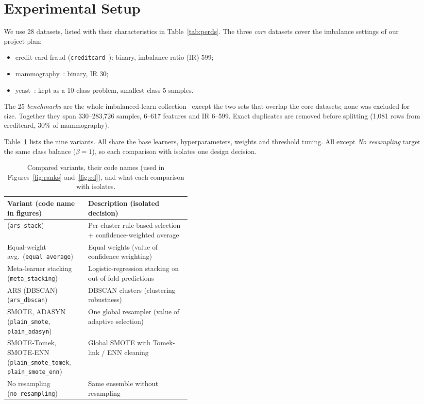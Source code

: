 \section{Experimental Setup}\label{sec:setup}

We use 28 datasets, listed with their characteristics in Table~\ref{tab:perds}. The three \emph{core} datasets cover
the imbalance settings of our project plan:
\begin{itemize}
  \item credit-card fraud (\texttt{creditcard}~\cite{dalpozzolo2015calibrating}): binary, imbalance ratio (IR) 599;
  \item mammography~\cite{woods1993comparative}: binary, IR 30;
  \item yeast~\cite{horton1996probabilistic}: kept as a 10-class problem, smallest class 5 samples.
\end{itemize}
The 25 \emph{benchmarks} are the whole imbalanced-learn collection~\cite{ding2011diversified,lemaitre2017imbalanced}
except the two sets that overlap the core datasets; none was excluded for size. Together they span 330--283{,}726
samples, 6--617 features and IR 6--599. Exact duplicates are removed before splitting (1{,}081 rows from creditcard,
30\% of mammography).

Table~\ref{tab:variants} lists the nine variants. All share the base learners, hyperparameters, weights and
threshold tuning. All except \emph{No resampling} target the same class balance ($\beta=1$), so each comparison with
\ars{} isolates one design decision.

\begin{table}
  \centering
  \caption{Compared variants, their code names (used in Figures~\ref{fig:ranks} and~\ref{fig:cd}), and what each comparison with \ars{} isolates.}
  \label{tab:variants}
  \scriptsize
  \begin{tabularx}{\linewidth}{@{}>{\raggedright\arraybackslash}p{0.44\linewidth}>{\raggedright\arraybackslash}X@{}}
    \toprule
    Variant (code name in figures) & Description (isolated decision) \\
    \midrule
    \ars{} (\texttt{ars\_stack}) & Per-cluster rule-based selection + confidence-weighted average \\
    Equal-weight avg.\ (\texttt{equal\_average}) & Equal weights (value of confidence weighting) \\
    Meta-learner stacking (\texttt{meta\_stacking}) & Logistic-regression stacking on out-of-fold predictions \\
    ARS (DBSCAN) (\texttt{ars\_dbscan}) & DBSCAN clusters (clustering robustness) \\
    SMOTE, ADASYN (\texttt{plain\_smote}, \texttt{plain\_adasyn}) & One global resampler (value of adaptive selection) \\
    SMOTE-Tomek, SMOTE-ENN (\texttt{plain\_smote\_tomek}, \texttt{plain\_smote\_enn}) & Global SMOTE with Tomek-link / ENN cleaning \\
    No resampling (\texttt{no\_resampling}) & Same ensemble without resampling \\
    \bottomrule
  \end{tabularx}
\end{table}

